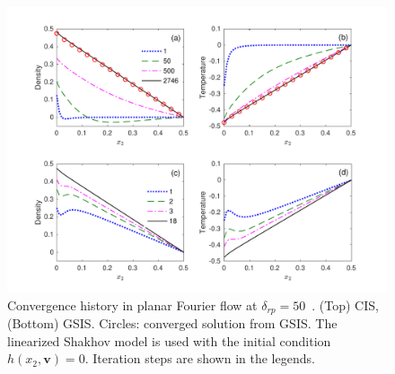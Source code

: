 \begin{figure}[t]
	\centering
	\includegraphics[scale=0.8,viewport=20 10 540 420,clip=true]{GSIS/IMG/Fourier_convergence_history.pdf}
	\caption{Convergence history in planar Fourier flow at $\delta_{rp} = 50$~\cite{SuArXiv2019}.  (Top) CIS, (Bottom) GSIS. Circles:  converged solution from GSIS. The linearized Shakhov model is used with the initial condition $h(x_2,\bm{v})=0$. Iteration steps are shown in the legends.}
	\label{fig:Fourier_histroy}
\end{figure}







